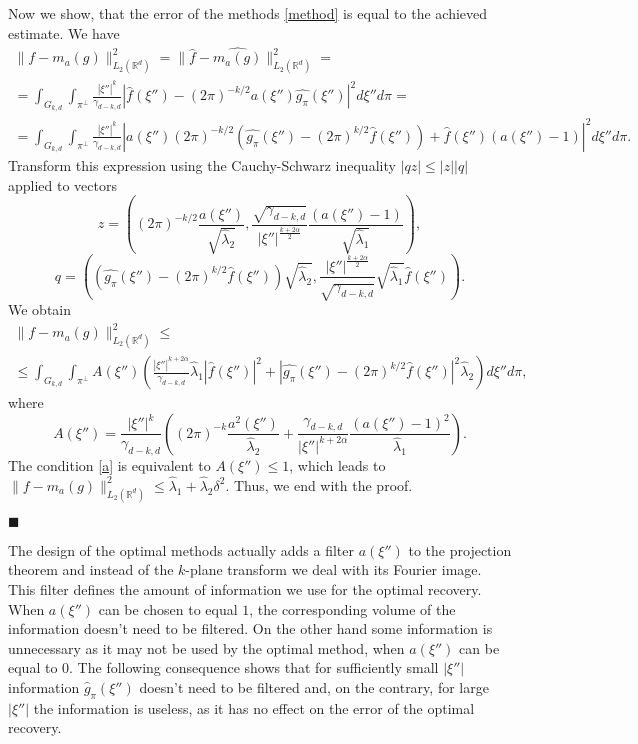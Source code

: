 \documentclass[12pt]{iopart}
\newenvironment{proof}
{\par\noindent{\bf Proof}}
{\hfill$\scriptstyle\blacksquare$}
\begin{document}
\begin{proof}
Now we show, that the error of the methods \eqref{method} is equal to the achieved estimate.
We have
\begin{multline*}
  \|f-m_a(g)\|^2_{L_2(\mathbb R^d)}=\|\widehat f-\widehat{m_a(g)}\|^2_{L_2(\mathbb R^d)}=\\
  =\int_{G_{k,d}}\int_{\pi^\perp}\frac{|\xi''|^k}{\gamma_{d-k,d}}\left|\widehat f(\xi'')-(2\pi)^{-k/2}a(\xi'')\widehat{g_\pi}(\xi'')\right|^2d\xi'' d\pi =\\
  =\int_{G_{k,d}}\int_{\pi^\perp}\frac{|\xi''|^k}{\gamma_{d-k,d}}\left|a(\xi'')(2\pi)^{-k/2}\left(\widehat{g_\pi }(\xi'')-(2\pi)^{k/2}\widehat 
      f(\xi'' )\right)+\widehat
    f(\xi'')\left(a(\xi'')-1\right)\right|^2d\xi'' d\pi .
\end{multline*}
Transform this expression using the Cauchy-Schwarz inequality $|qz|\leqslant |z||q|$ applied to vectors
\[
z=\left((2\pi)^{-k/2}\frac{a(\xi'')}{\sqrt{\widehat\lambda_2}},\frac{\sqrt{\gamma_{d-k,d}}}{|\xi''|^{\frac{k+2\alpha}{2}}}\frac{(a(\xi'')-1)}{\sqrt{\widehat\lambda_1}}\right),
\]
\[
q=\left(\left(\widehat{g_\pi }(\xi'')-(2\pi)^{k/2}\widehat
    f(\xi'' )\right)\sqrt{\widehat\lambda_2},\frac{|\xi''|^{\frac{k+2\alpha}{2}}}{\sqrt{\gamma_{d-k,d}}}\sqrt{\widehat\lambda_1}\widehat
  f(\xi'' )\right).
\]
We obtain
\begin{multline*}  
  \|f-m_a(g)\|^2_{L_2(\mathbb R^d)}\leqslant  \\
  \leqslant \int_{G_{k,d}}\int_{\pi^\perp}
  A(\xi'')\left(\frac{|\xi''|^{k+2\alpha}}{\gamma_{d-k,d}}\widehat\lambda_1|\widehat
    f(\xi'')|^2+\left|\widehat{g_\pi
      }(\xi'')-(2\pi)^{k/2}\widehat f(\xi''
      )\right|^2\widehat\lambda_2\right)d\xi'' d\pi ,
\end{multline*}
where
  \[
  A(\xi'')=\frac{|\xi''|^k}{\gamma_{d-k,d}}\left((2\pi)^{-k}\frac{a^2(\xi'')}{\widehat\lambda_2}+\frac{\gamma_{d-k,d}}{|\xi''|^{k+2\alpha}}\frac{(a(\xi'')-1)^2}{\widehat\lambda_1}\right).
  \]
  The condition \eqref{a} is equivalent to $A(\xi'')\leqslant 1$, which leads to $ \|f-m_a(g)\|^2_{L_2(\mathbb R^d)}\leqslant
  \widehat\lambda_1+\widehat\lambda_2\delta^2.$
Thus, we end with the proof.

\end{proof}

The design of the optimal methods actually adds a filter $a(\xi'')$ to the projection theorem and instead of the $k$-plane transform we deal with its Fourier image. This filter defines the amount of information we use for the optimal recovery. When $a(\xi'')$ can be chosen to equal $1$, the corresponding volume of the information doesn't need to be filtered. On the other hand some information is unnecessary as it may not be used by the optimal method, when $a(\xi'')$ can be equal to $0$. The following consequence shows that for sufficiently small  $|\xi''|$ information $\hat g_\pi(\xi'')$ doesn't need to be filtered and, on the contrary, for large  $|\xi''|$ the information is useless, as it  has no effect on the error of the optimal recovery.
\end{document}

